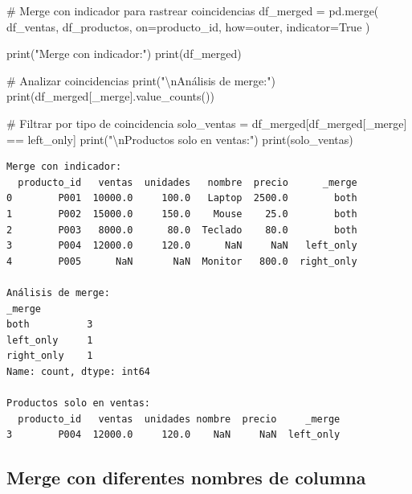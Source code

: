 \documentclass[
  doc,
  floatsintext,
  longtable,
  a4paper,
  nolmodern,
  notxfonts,
  notimes,
  12pt,
  colorlinks=true,linkcolor=blue,citecolor=blue,urlcolor=blue]{apa7}
\newenvironment{Shaded}{\begin{snugshade}}{\end{snugshade}}
\newcommand{\BuiltInTok}[1]{\textcolor[rgb]{0.00,0.23,0.31}{#1}}
\newcommand{\CharTok}[1]{\textcolor[rgb]{0.13,0.47,0.30}{#1}}
\newcommand{\CommentTok}[1]{\textcolor[rgb]{0.37,0.37,0.37}{#1}}
\newcommand{\NormalTok}[1]{\textcolor[rgb]{0.00,0.23,0.31}{#1}}
\newcommand{\OperatorTok}[1]{\textcolor[rgb]{0.37,0.37,0.37}{#1}}
\newcommand{\StringTok}[1]{\textcolor[rgb]{0.13,0.47,0.30}{#1}}
\newcommand{\VariableTok}[1]{\textcolor[rgb]{0.07,0.07,0.07}{#1}}
\begin{document}
\begin{Shaded}
\begin{Highlighting}[]
\CommentTok{\# Merge con indicador para rastrear coincidencias}
\NormalTok{df\_merged }\OperatorTok{=}\NormalTok{ pd.merge(}
\NormalTok{    df\_ventas, }
\NormalTok{    df\_productos, }
\NormalTok{    on}\OperatorTok{=}\StringTok{\textquotesingle{}producto\_id\textquotesingle{}}\NormalTok{, }
\NormalTok{    how}\OperatorTok{=}\StringTok{\textquotesingle{}outer\textquotesingle{}}\NormalTok{,}
\NormalTok{    indicator}\OperatorTok{=}\VariableTok{True}
\NormalTok{)}

\BuiltInTok{print}\NormalTok{(}\StringTok{"Merge con indicador:"}\NormalTok{)}
\BuiltInTok{print}\NormalTok{(df\_merged)}

\CommentTok{\# Analizar coincidencias}
\BuiltInTok{print}\NormalTok{(}\StringTok{"}\CharTok{\textbackslash{}n}\StringTok{Análisis de merge:"}\NormalTok{)}
\BuiltInTok{print}\NormalTok{(df\_merged[}\StringTok{\textquotesingle{}\_merge\textquotesingle{}}\NormalTok{].value\_counts())}

\CommentTok{\# Filtrar por tipo de coincidencia}
\NormalTok{solo\_ventas }\OperatorTok{=}\NormalTok{ df\_merged[df\_merged[}\StringTok{\textquotesingle{}\_merge\textquotesingle{}}\NormalTok{] }\OperatorTok{==} \StringTok{\textquotesingle{}left\_only\textquotesingle{}}\NormalTok{]}
\BuiltInTok{print}\NormalTok{(}\StringTok{"}\CharTok{\textbackslash{}n}\StringTok{Productos solo en ventas:"}\NormalTok{)}
\BuiltInTok{print}\NormalTok{(solo\_ventas)}
\end{Highlighting}
\end{Shaded}

\begin{verbatim}
Merge con indicador:
  producto_id   ventas  unidades   nombre  precio      _merge
0        P001  10000.0     100.0   Laptop  2500.0        both
1        P002  15000.0     150.0    Mouse    25.0        both
2        P003   8000.0      80.0  Teclado    80.0        both
3        P004  12000.0     120.0      NaN     NaN   left_only
4        P005      NaN       NaN  Monitor   800.0  right_only

Análisis de merge:
_merge
both          3
left_only     1
right_only    1
Name: count, dtype: int64

Productos solo en ventas:
  producto_id   ventas  unidades nombre  precio     _merge
3        P004  12000.0     120.0    NaN     NaN  left_only
\end{verbatim}

\subsection{Merge con diferentes nombres de
columna}\label{merge-con-diferentes-nombres-de-columna}
\end{document}
